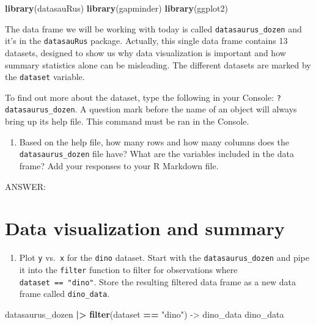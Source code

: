 \documentclass[
]{article}
\newenvironment{Shaded}{\begin{snugshade}}{\end{snugshade}}
\newcommand{\FunctionTok}[1]{\textcolor[rgb]{0.13,0.29,0.53}{\textbf{#1}}}
\newcommand{\NormalTok}[1]{#1}
\newcommand{\OtherTok}[1]{\textcolor[rgb]{0.56,0.35,0.01}{#1}}
\newcommand{\SpecialCharTok}[1]{\textcolor[rgb]{0.81,0.36,0.00}{\textbf{#1}}}
\newcommand{\StringTok}[1]{\textcolor[rgb]{0.31,0.60,0.02}{#1}}
\providecommand{\tightlist}{%
  \setlength{\itemsep}{0pt}\setlength{\parskip}{0pt}}
\begin{document}
\begin{Shaded}
\begin{Highlighting}[]
\FunctionTok{library}\NormalTok{(datasauRus)}
\FunctionTok{library}\NormalTok{(gapminder)}
\FunctionTok{library}\NormalTok{(ggplot2)}
\end{Highlighting}
\end{Shaded}

The data frame we will be working with today is called
\texttt{datasaurus\_dozen} and it's in the \texttt{datasauRus} package.
Actually, this single data frame contains 13 datasets, designed to show
us why data visualization is important and how summary statistics alone
can be misleading. The different datasets are marked by the
\texttt{dataset} variable.

To find out more about the dataset, type the following in your Console:
\texttt{?datasaurus\_dozen}. A question mark before the name of an
object will always bring up its help file. This command must be ran in
the Console.

\begin{enumerate}
\def\labelenumi{\arabic{enumi}.}
\tightlist
\item
  Based on the help file, how many rows and how many columns does the
  \texttt{datasaurus\_dozen} file have? What are the variables included
  in the data frame? Add your responses to your R Markdown file.
\end{enumerate}

ANSWER:

\section{Data visualization and
summary}\label{data-visualization-and-summary}

\begin{enumerate}
\def\labelenumi{\arabic{enumi}.}
\setcounter{enumi}{1}
\tightlist
\item
  Plot \texttt{y} vs.~\texttt{x} for the \texttt{dino} dataset. Start
  with the \texttt{datasaurus\_dozen} and pipe it into the
  \texttt{filter} function to filter for observations where
  \texttt{dataset\ ==\ "dino"}. Store the resulting filtered data frame
  as a new data frame called \texttt{dino\_data}.
\end{enumerate}

\begin{Shaded}
\begin{Highlighting}[]
\NormalTok{datasaurus\_dozen }\SpecialCharTok{|\textgreater{}} 
  \FunctionTok{filter}\NormalTok{(dataset }\SpecialCharTok{==} \StringTok{"dino"}\NormalTok{) }\OtherTok{{-}\textgreater{}}\NormalTok{ dino\_data}
\NormalTok{dino\_data}
\end{Highlighting}
\end{Shaded}
\end{document}

